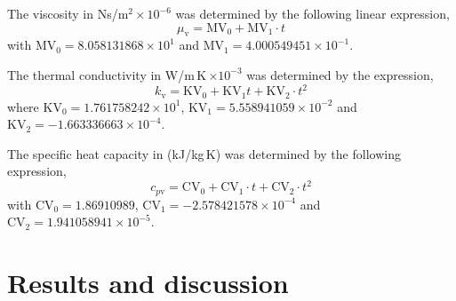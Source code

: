 \documentclass[11pt]{article}
\begin{document}

\noindent The viscosity in Ns/m$^2\times10^{-6}$ was determined by the
following linear expression,
\begin{equation}
\mu_\mathrm{v} = \mathrm{MV}_0 + \mathrm{MV}_1\cdot t
\end{equation}
with $\mathrm{MV}_0 = 8.058131868\times10^{1}$ and
$\mathrm{MV}_1 = 4.000549451\times10^{-1}$.

\noindent The thermal conductivity in W/m\,K\,$\times10^{-3}$ was
determined by the expression,
\begin{equation}
k_\mathrm{v} = \mathrm{KV}_0 + \mathrm{KV}_1 t
  + \mathrm{KV}_2\cdot t^{2}
\end{equation}
where $\mathrm{KV}_0 = 1.761758242\times10^{1}$,
$\mathrm{KV}_1 = 5.558941059\times10^{-2}$ and
$\mathrm{KV}_2 = -1.663336663\times10^{-4}$.

\noindent The specific heat capacity in (kJ/kg\,K) was determined by
the following expression,
\begin{equation}
c_{p\mathrm{v}} = \mathrm{CV}_0 + \mathrm{CV}_1\cdot t
  + \mathrm{CV}_2\cdot t^{2}
\end{equation}
with $\mathrm{CV}_0 = 1.86910989$,
$\mathrm{CV}_1 = -2.578421578\times10^{-4}$ and
$\mathrm{CV}_2 = 1.941058941\times10^{-5}$.

\section{Results and discussion}
\end{document}
